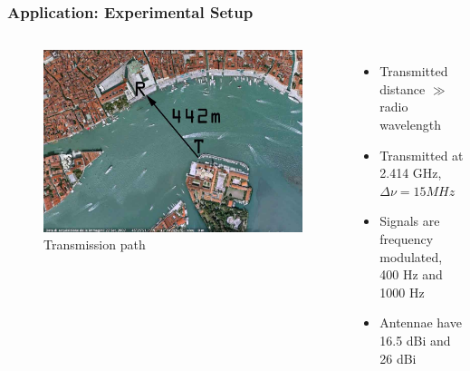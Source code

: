 \documentclass[xcolor=dvipsnames]{beamer}
\newenvironment{items}[1][]
{\begin{itemize}
    \ifthenelse{\isempty{#1}}
    {\setlength{\itemsep}{12pt}}{\setlength{\itemsep}{#1}}}
  {\end{itemize}}
\begin{document}
\begin{frame}
        \frametitle{Application: Experimental Setup}
  \begin{columns}[c]
                \begin{figure}
      \includegraphics[width=\textwidth]{birdeyeview}
      \caption{Transmission path}
      \label{pic:birdeye}
                \end{figure}
                \begin{items}
                \item Transmitted distance $\gg$ radio wavelength
                \item Transmitted at 2.414 GHz, $\Delta \nu = 15MHz$
                \item Signals are frequency modulated, 400 Hz and 1000 Hz
                \item Antennae have 16.5 dBi and 26 dBi
                \end{items}
  \end{columns}
\end{frame}
\end{document}
